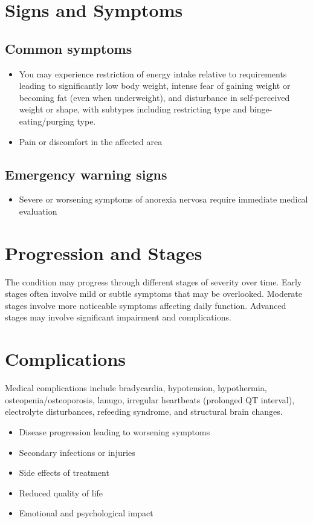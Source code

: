 \section{Signs and Symptoms}

\subsection{Common symptoms}
\begin{itemize}[noitemsep]
  \item You may experience restriction of energy intake relative to requirements leading to significantly low body weight, intense fear of gaining weight or becoming fat (even when underweight), and disturbance in self-perceived weight or shape, with subtypes including restricting type and binge-eating/purging type.
  \item Pain or discomfort in the affected area
  \end{itemize}

\subsection{Emergency warning signs}
\begin{itemize}[noitemsep]
  \item Severe or worsening symptoms of anorexia nervosa require immediate medical evaluation
\end{itemize}
\section{Progression and Stages}
The condition may progress through different stages of severity over time. Early stages often involve mild or subtle symptoms that may be overlooked. Moderate stages involve more noticeable symptoms affecting daily function. Advanced stages may involve significant impairment and complications.
\section{Complications}
Medical complications include bradycardia, hypotension, hypothermia, osteopenia/osteoporosis, lanugo, irregular heartbeats (prolonged QT interval), electrolyte disturbances, refeeding syndrome, and structural brain changes.

\begin{itemize}[noitemsep]
  \item Disease progression leading to worsening symptoms
  \item Secondary infections or injuries
  \item Side effects of treatment
  \item Reduced quality of life
  \item Emotional and psychological impact
\end{itemize}
